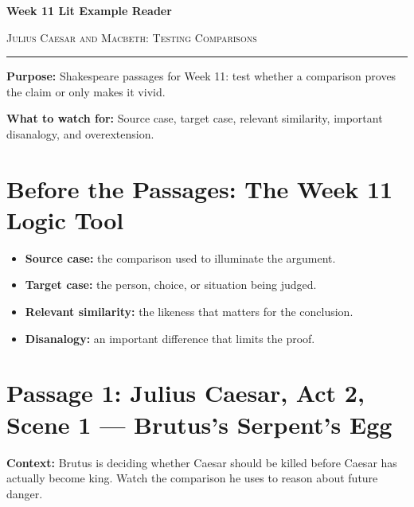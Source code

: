 \documentclass[12pt]{article}
\begin{document}
\begin{center}
{\LARGE\bfseries Week 11 Lit Example Reader}\par\vspace{0.02em}
{\large\scshape Julius Caesar and Macbeth: Testing Comparisons}\par\vspace{0.06em}
\rule{0.78\textwidth}{0.5pt}
\end{center}

\textbf{Purpose:} Shakespeare passages for Week 11: test whether a comparison proves the claim or only makes it vivid.

\textbf{What to watch for:} Source case, target case, relevant similarity, important disanalogy, and overextension.

\section*{Before the Passages: The Week 11 Logic Tool}

\begin{itemize}[leftmargin=1.3em,itemsep=0.05em,topsep=0.08em,parsep=0.03em]
\item \textbf{Source case:} the comparison used to illuminate the argument.
\item \textbf{Target case:} the person, choice, or situation being judged.
\item \textbf{Relevant similarity:} the likeness that matters for the conclusion.
\item \textbf{Disanalogy:} an important difference that limits the proof.
\end{itemize}

\section*{Passage 1: Julius Caesar, Act 2, Scene 1 --- Brutus's Serpent's Egg}

\textbf{Context:} Brutus is deciding whether Caesar should be killed before Caesar has actually become king. Watch the comparison he uses to reason about future danger.
\end{document}

